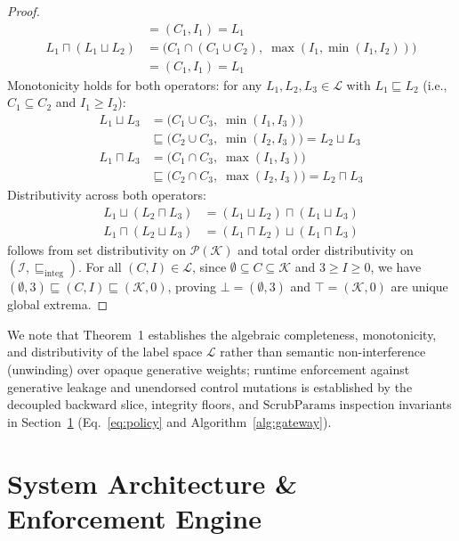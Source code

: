 \documentclass[conference,10pt]{IEEEtran}
\begin{document}
\begin{proof}
\begin{align*}
&= (C_1, I_1) = L_1 \\
L_1 \sqcap (L_1 \sqcup L_2) &= \big( C_1 \cap (C_1 \cup C_2), \; \max(I_1, \min(I_1, I_2)) \big) \\
&= (C_1, I_1) = L_1
\end{align*}
Monotonicity holds for both operators: for any $L_1, L_2, L_3 \in \mathcal{L}$ with $L_1 \sqsubseteq L_2$ (i.e., $C_1 \subseteq C_2$ and $I_1 \ge I_2$):
\begin{align*}
L_1 \sqcup L_3 &= \big( C_1 \cup C_3, \; \min(I_1, I_3) \big) \\
&\sqsubseteq \big( C_2 \cup C_3, \; \min(I_2, I_3) \big) = L_2 \sqcup L_3 \\
L_1 \sqcap L_3 &= \big( C_1 \cap C_3, \; \max(I_1, I_3) \big) \\
&\sqsubseteq \big( C_2 \cap C_3, \; \max(I_2, I_3) \big) = L_2 \sqcap L_3
\end{align*}
Distributivity across both operators:
\begin{align*}
L_1 \sqcup (L_2 \sqcap L_3) &= (L_1 \sqcup L_2) \sqcap (L_1 \sqcup L_3) \\
L_1 \sqcap (L_2 \sqcup L_3) &= (L_1 \sqcap L_2) \sqcup (L_1 \sqcap L_3)
\end{align*}
follows from set distributivity on $\mathcal{P}(\mathcal{K})$ and total order distributivity on $(\mathcal{I}, \sqsubseteq_{\text{integ}})$. For all $(C, I) \in \mathcal{L}$, since $\emptyset \subseteq C \subseteq \mathcal{K}$ and $3 \ge I \ge 0$, we have $(\emptyset, 3) \sqsubseteq (C, I) \sqsubseteq (\mathcal{K}, 0)$, proving $\bot = (\emptyset, 3)$ and $\top = (\mathcal{K}, 0)$ are unique global extrema.
\end{proof}
We note that Theorem~1 establishes the algebraic completeness, monotonicity, and distributivity of the label space $\mathcal{L}$ rather than semantic non-interference (unwinding) over opaque generative weights; runtime enforcement against generative leakage and unendorsed control mutations is established by the decoupled backward slice, integrity floors, and $\text{ScrubParams}$ inspection invariants in Section~\ref{sec:arch} (Eq.~\ref{eq:policy} and Algorithm~\ref{alg:gateway}).

\section{System Architecture \& Enforcement Engine}
\label{sec:arch}
\end{document}

